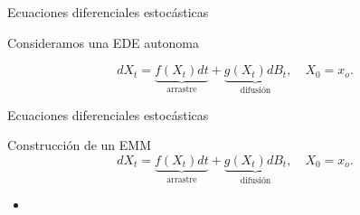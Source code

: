 \begin{frame}{Ecuaciones diferenciales estoc\'asticas}
    \begin{block}{Consideramos una EDE autonoma }
  \begin{overlayarea}{\textwidth}{.5\textheight}
    \begin{equation*}
      dX_t=\underbrace{f(X_t)dt}_{\text{arrastre}}+\underbrace{g(X_t)dB_t}_{\text{difusi\'on}}, \quad X_0=x_o.
    \end{equation*}
  \end{overlayarea}
    \end{block}
\end{frame}
\begin{frame}{Ecuaciones diferenciales estoc\'asticas}
    \begin{block}{Construcción de un EMM}
    \begin{equation*}
      dX_t=\underbrace{f(X_t)dt}_{\text{arrastre}}+\underbrace{g(X_t)dB_t}_{\text{difusi\'on}}, \quad X_0=x_o.
    \end{equation*}
    \begin{itemize}
      \item
    \end{itemize}
    \end{block}
\end{frame}
